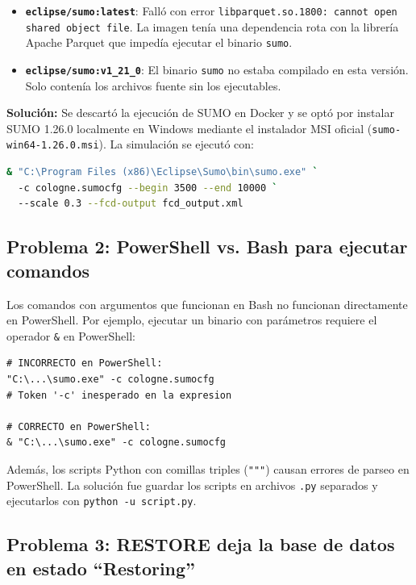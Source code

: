 \documentclass[12pt,a4paper]{article}
\begin{document}
\begin{itemize}
  \item \textbf{\texttt{eclipse/sumo:latest}}: Fall\'o con error \texttt{libparquet.so.1800: cannot open shared object file}. La imagen ten\'ia una dependencia rota con la librer\'ia Apache Parquet que imped\'ia ejecutar el binario \texttt{sumo}.
  \item \textbf{\texttt{eclipse/sumo:v1\_21\_0}}: El binario \texttt{sumo} no estaba compilado en esta versi\'on. Solo conten\'ia los archivos fuente sin los ejecutables.
\end{itemize}

\textbf{Soluci\'on:} Se descart\'o la ejecuci\'on de SUMO en Docker y se opt\'o por instalar SUMO 1.26.0 localmente en Windows mediante el instalador MSI oficial (\texttt{sumo-win64-1.26.0.msi}). La simulaci\'on se ejecut\'o con:

\begin{lstlisting}[language=bash,caption={Comando para ejecutar SUMO}]
& "C:\Program Files (x86)\Eclipse\Sumo\bin\sumo.exe" `
  -c cologne.sumocfg --begin 3500 --end 10000 `
  --scale 0.3 --fcd-output fcd_output.xml
\end{lstlisting}

\subsection{Problema 2: PowerShell vs. Bash para ejecutar comandos}

Los comandos con argumentos que funcionan en Bash no funcionan directamente en PowerShell. Por ejemplo, ejecutar un binario con par\'ametros requiere el operador \texttt{\&} en PowerShell:

\begin{lstlisting}[caption={Error en PowerShell sin operador \&}]
# INCORRECTO en PowerShell:
"C:\...\sumo.exe" -c cologne.sumocfg
# Token '-c' inesperado en la expresion

# CORRECTO en PowerShell:
& "C:\...\sumo.exe" -c cologne.sumocfg
\end{lstlisting}

Adem\'as, los scripts Python con comillas triples (\texttt{"""}) causan errores de parseo en PowerShell. La soluci\'on fue guardar los scripts en archivos \texttt{.py} separados y ejecutarlos con \texttt{python -u script.py}.

\subsection{Problema 3: RESTORE deja la base de datos en estado ``Restoring''}
\end{document}
